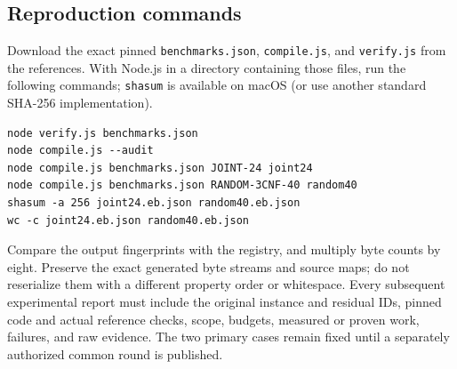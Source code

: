 \documentclass[11pt,letterpaper]{article}
\theoremstyle{definition}
\newcommand{\id}[1]{\nolinkurl{#1}}
\begin{document}
\subsection{Reproduction commands}
Download the exact pinned \id{benchmarks.json}, \id{compile.js}, and \id{verify.js} from the references. With Node.js in a directory containing those files, run the following commands; \id{shasum} is available on macOS (or use another standard SHA-256 implementation).
\begin{verbatim}
node verify.js benchmarks.json
node compile.js --audit
node compile.js benchmarks.json JOINT-24 joint24
node compile.js benchmarks.json RANDOM-3CNF-40 random40
shasum -a 256 joint24.eb.json random40.eb.json
wc -c joint24.eb.json random40.eb.json
\end{verbatim}
Compare the output fingerprints with the registry, and multiply byte counts by eight. Preserve the exact generated byte streams and source maps; do not reserialize them with a different property order or whitespace. Every subsequent experimental report must include the original instance and residual IDs, pinned code and actual reference checks, scope, budgets, measured or proven work, failures, and raw evidence. The two primary cases remain fixed until a separately authorized common round is published.
\end{document}
